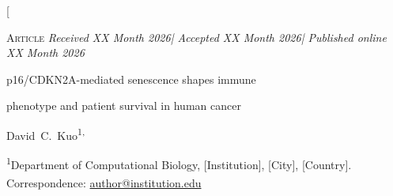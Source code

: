 \documentclass[10pt,twocolumn]{article}
\begin{document}
\twocolumn[%
\begin{@twocolumnfalse}

  \vspace*{4pt}
  {\fontsize{7}{9}\selectfont\color{medgray}\textsc{Article}\hfill
   \textit{Received XX Month 2026\enspace|\enspace
           Accepted XX Month 2026\enspace|\enspace
           Published online XX Month 2026}\par}
  \vspace{8pt}

  {\fontsize{18}{22}\bfseries\raggedright
   p16/CDKN2A-mediated senescence shapes immune\par
   phenotype and patient survival in human cancer\par}

  \vspace{10pt}

  {\fontsize{8.5}{12}\selectfont
   David~C.~Kuo\textsuperscript{1,\dag}\par}

  \vspace{6pt}

  {\fontsize{7.5}{10}\selectfont\color{darkgray}
   \textsuperscript{1}Department of Computational Biology,
   [Institution], [City], [Country].\\
   \textsuperscript{\dag}Correspondence:
   \href{mailto:author@institution.edu}{author@institution.edu}\par}

  \vspace{10pt}


\end{@twocolumnfalse}
\end{document}
